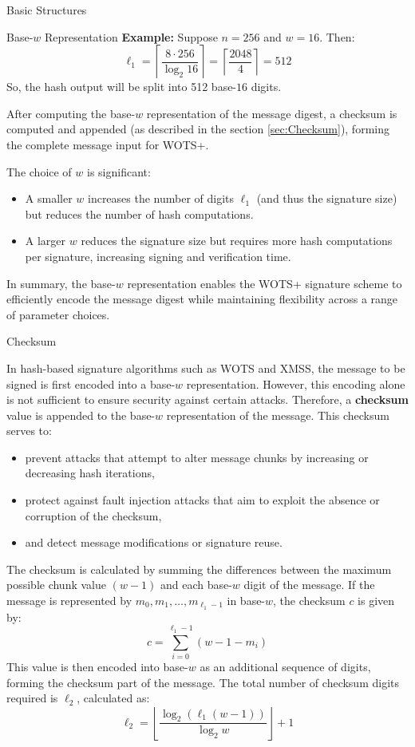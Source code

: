 \documentclass [version=submission]{iacrcc}
\begin{document}
\begin{section}{Basic Structures}{\label{sec1}}
\begin{subsection}{Base-\texorpdfstring{$w$}{w} Representation }
\textbf{Example:}  
Suppose $n = 256$ and $w = 16$. Then:
\[
\ell_1 = \left\lceil \frac{8 \cdot 256}{\log_2 16} \right\rceil = \left\lceil \frac{2048}{4} \right\rceil = 512
\]
So, the hash output will be split into 512 base-$16$ digits.

After computing the base-$w$ representation of the message digest, a checksum is computed and appended (as described in the section \ref{sec:Checksum}), forming the complete message input for WOTS+.

The choice of $w$ is significant: 
\begin{itemize}
    \item A smaller $w$ increases the number of digits $\ell_1$ (and thus the signature size) but reduces the number of hash computations.
    \item A larger $w$ reduces the signature size but requires more hash computations per signature, increasing signing and verification time.
\end{itemize}

In summary, the base-$w$ representation enables the WOTS+ signature scheme to efficiently encode the message digest while maintaining flexibility across a range of parameter choices.

\end{subsection}


\begin{subsection}{Checksum}{\label{sec:Checksum}}

In hash-based signature algorithms such as WOTS and XMSS, the message to be signed is first encoded into a base-$w$ representation. However, this encoding alone is not sufficient to ensure security against certain attacks. Therefore, a \textbf{checksum} value is appended to the base-$w$ representation of the message. This checksum serves to:

\begin{itemize}
    \item prevent attacks that attempt to alter message chunks by increasing or decreasing hash iterations,
    \item protect against fault injection attacks that aim to exploit the absence or corruption of the checksum,
    \item and detect message modifications or signature reuse.
\end{itemize}

The checksum is calculated by summing the differences between the maximum possible chunk value $(w-1)$ and each base-$w$ digit of the message. If the message is represented by $m_0, m_1, \ldots, m_{\ell_1-1}$ in base-$w$, the checksum $c$ is given by:
\[
c = \sum_{i=0}^{\ell_1-1} (w - 1 - m_i)
\]
This value is then encoded into base-$w$ as an additional sequence of digits, forming the checksum part of the message. The total number of checksum digits required is $\ell_2$, calculated as:
\[
\ell_2 = \left\lfloor \frac{\log_2(\ell_1(w-1))}{\log_2 w} \right\rfloor + 1
\]


\end{subsection}
\end{section}
\end{document}
